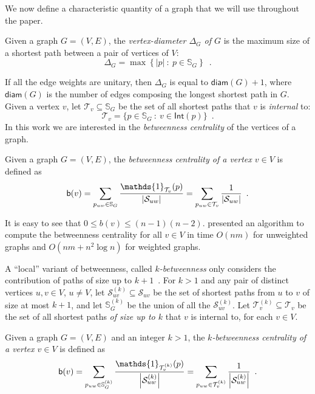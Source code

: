 We now define a characteristic quantity of a graph that we will use throughout
the paper.
\begin{definition}\label{def:vertexdiam}
  Given a graph $G=(V,E)$, the \emph{vertex-diameter $\Delta_G$ of $G$} is the
  maximum size of a shortest path between a pair of vertices of $V$:
  \[
  \Delta_G = \max\left\{|p| ~:~ p\in \mathbb{S}_G\right\}\enspace.\]
\end{definition}
If all the edge weights are unitary, then $\Delta_G$ is equal to
$\mathsf{diam}(G)+1$, where $\mathsf{diam}(G)$ is the number of edges composing the
longest shortest path in $G$.
Given a vertex $v$, let $\mathcal{T}_v\subseteq\mathbb{S}_G$ be the set of all
shortest paths that $v$ is \emph{internal} to:
\[
\mathcal{T}_v=\{p\in\mathbb{S}_G ~:~ v\in\mathsf{Int}(p)\}\enspace.
\]
In this work we are interested in the \emph{betweenness centrality} of the
vertices of a graph.
\begin{definition}\label{def:betwenness}
  \citep{Anthonisse71,Freeman77}
  Given a graph $G=(V,E)$, the \emph{betweenness centrality of a vertex $v\in
  V$} is defined as
  \[
  \betw(v)=\sum_{p_{uw}\in\mathbb{S}_G}\frac{\mathds{1}_{\mathcal{T}_v}(p)}{|\mathcal{S}_{uw}|}=\sum_{p_{uw}\in\mathcal{T}_v}\frac{1}{|\mathcal{S}_{uw}|}\enspace.
  \]
\end{definition} 

It is easy to see that $0\le b(v)\le (n-1)(n-2)$. \citet{Brandes01} presented an
algorithm to compute the betweenness centrality for all $v\in V$ in time
$O(nm)$ for unweighted graphs and $O(nm + n^2 \log n)$ for weighted graphs. 

A ``local'' variant of betweenness, called \emph{$k$-betweenness} only considers
the contribution of paths of size up to $k+1$~\citep{BorgattiE06,Brandes08}.
For $k>1$ and any pair of distinct vertices $u,v\in V$, $u\neq V$, let
$\mathcal{S}^{(k)}_{uv}\subseteq\mathcal{S}_{uv}$ be the set of shortest paths
from $u$ to $v$ of size at most $k+1$, and let $\mathbb{S}^{(k)}_G$ be the union
of all the $\mathcal{S}^{(k)}_{uv}$. Let
$\mathcal{T}^{(k)}_v\subseteq\mathcal{T}_v$ be the set of all shortest paths
\emph{of size up to $k$} that $v$ is internal to, for each $v\in V$.

\begin{definition}\label{def:kbetweenness}
  \cite{BorgattiE06,Brandes08}
  Given a graph $G=(V,E)$ and an integer $k>1$, the \emph{$k$-betweenness
  centrality of a vertex $v\in V$} is defined as
  \[
  \betw(v)=\sum_{p_{uw}\in\mathbb{S}^{(k)}_G}\frac{\mathds{1}_{\mathcal{T}^{(k)}_v}(p)}{\left|\mathcal{S}^{(k)}_{uw}\right|}=\sum_{p_{uw}\in\mathcal{T}^{(k)}_v}\frac{1}{\left|\mathcal{S}^{(k)}_{uw}\right|}\enspace.
  \]
\end{definition}

